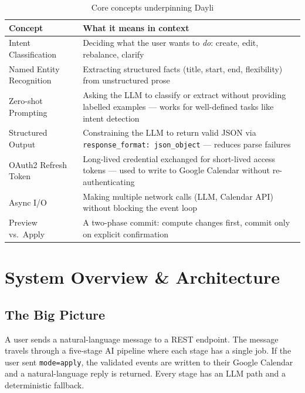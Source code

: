 \documentclass[12pt, a4paper]{article}
\begin{document}
\begin{table}[htbp]
\centering
\renewcommand{\arraystretch}{1.4}
\begin{tabularx}{\textwidth}{L{3.5cm} X}
\toprule
\textbf{Concept} & \textbf{What it means in context} \\
\midrule
Intent Classification
  & Deciding what the user wants to \emph{do}: create, edit, rebalance, clarify \\
Named Entity Recognition
  & Extracting structured facts (title, start, end, flexibility) from unstructured prose \\
Zero-shot Prompting
  & Asking the LLM to classify or extract without providing labelled examples --- works for well-defined tasks like intent detection \\
Structured Output
  & Constraining the LLM to return valid JSON via \texttt{response\_format: json\_object} --- reduces parse failures \\
OAuth2 Refresh Token
  & Long-lived credential exchanged for short-lived access tokens --- used to write to Google Calendar without re-authenticating \\
Async I/O
  & Making multiple network calls (LLM, Calendar API) without blocking the event loop \\
Preview vs.\ Apply
  & A two-phase commit: compute changes first, commit only on explicit confirmation \\
\bottomrule
\end{tabularx}
\caption{Core concepts underpinning Dayli}
\end{table}


\section{System Overview \& Architecture}

\subsection{The Big Picture}

A user sends a natural-language message to a REST endpoint. The message travels through a five-stage AI pipeline where each stage has a single job. If the user sent \texttt{mode=apply}, the validated events are written to their Google Calendar and a natural-language reply is returned. Every stage has an LLM path and a deterministic fallback.
\end{document}
